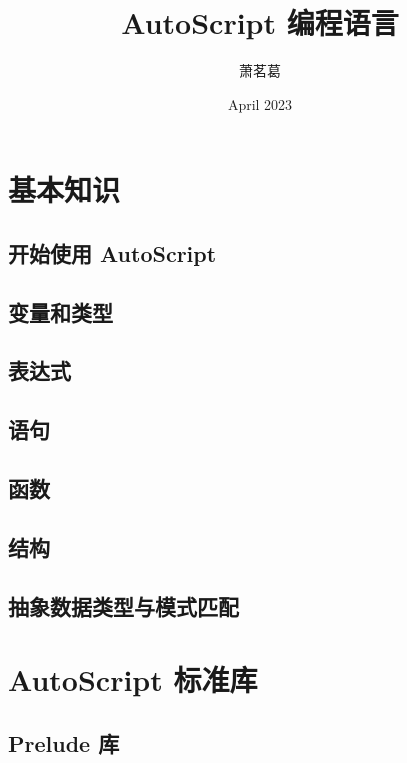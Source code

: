 \documentclass[lang=cn, scheme=chinese, 10pt]{elegantbook}
\title{AutoScript 编程语言}
\author{萧茗葛}
\date{April 2023}
\begin{document}
\maketitle
\frontmatter
\tableofcontents
\mainmatter

\part{基本知识}

\chapter{开始使用 AutoScript}


\chapter{变量和类型}


\chapter{表达式}


\chapter{语句}


\chapter{函数}


\chapter{结构}


\chapter{抽象数据类型与模式匹配}


\part{AutoScript 标准库}

\chapter{Prelude 库}

\end{document}
